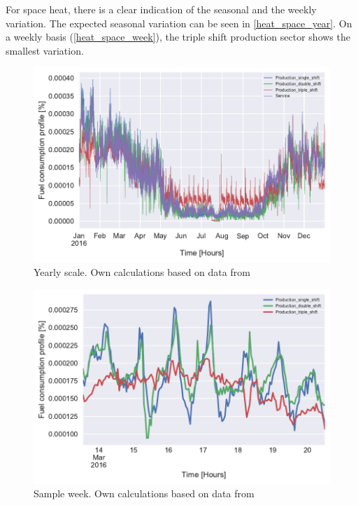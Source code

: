 \documentclass[review]{elsarticle}
\begin{document}
For space heat, there is a clear indication of the seasonal and the weekly variation. The expected seasonal variation can be seen in \autoref{heat_space_year}. On a weekly basis (\autoref{heat_space_week}), the triple shift production sector shows the smallest variation.

\begin{figure}[H]
\centering
\includegraphics[width=\linewidth]{Img/profiles/heatprofile_space_year_perc.pdf}
\caption{Yearly scale. Own calculations based on data from \cite{DanskGasDistribution2016,VM2015}}
\label{heat_space_year}
\end{figure}
	
\begin{figure}[H]
\centering
\includegraphics[width=\linewidth]{Img/profiles/heatprofile_space_week_perc_noserv.pdf}
\caption{Sample week. Own calculations based on data from \cite{DanskGasDistribution2016,VM2015}}
\label{heat_space_week}
\end{figure}
\end{document}
